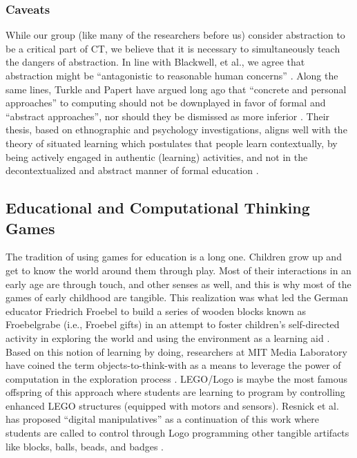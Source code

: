 \documentclass{acm_proc_article-sp}
\begin{document}
\subsubsection{Caveats}
While our group (like many of the researchers before us) consider abstraction to be a critical part of CT, we believe that it is necessary to simultaneously teach the dangers of abstraction. In line with Blackwell, et al., we agree that abstraction might be ``antagonistic to reasonable human concerns'' \cite{blackwell2008abstract}. Along the same lines, Turkle and Papert have argued long ago that ``concrete and personal approaches'' to computing should not be downplayed in favor of formal and ``abstract approaches'', nor should they be dismissed as more inferior \cite{turkle1990epistemological}. Their thesis, based on ethnographic and psychology investigations, aligns well with the theory of situated learning which postulates that people learn contextually, by being actively engaged in authentic (learning) activities, and not in the decontextualized and abstract manner of formal education \cite{brown1989situated}.

\subsection{Educational and Computational Thinking Games}
The tradition of using games for education is a long one. Children grow up and get to know the world around them through play. Most of their interactions in an early age are through touch, and other senses as well, and this is why most of the games of early childhood are tangible. This realization was what led the German educator Friedrich Froebel to build a series of wooden blocks known as Froebelgrabe (i.e., Froebel gifts) in an attempt to foster children’s self-directed activity in exploring the world and using the environment as a learning aid \cite{liebschner1992child}. Based on this notion of learning by doing, researchers at MIT Media Laboratory have coined the term objects-to-think-with as a means to leverage the power of computation in the exploration process \cite{resnick1998digital,schweikardt2006roblocks}. LEGO/Logo is maybe the most famous offspring of this approach where students are learning to program by controlling enhanced LEGO structures (equipped with motors and sensors). Resnick et al. has proposed ``digital manipulatives'' as a continuation of this work where students are called to control through Logo programming other tangible artifacts like blocks, balls, beads, and badges \cite{liebschner1992child}.
\end{document}
